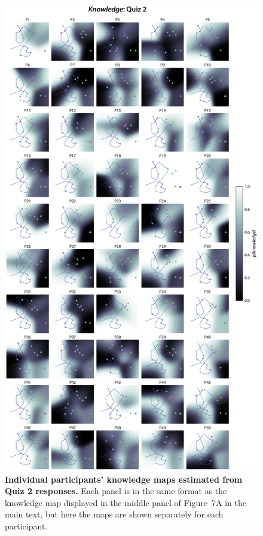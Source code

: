\documentclass[10pt]{article}
\newcommand{\knowledgeMaps}{7}
\begin{document}
\begin{figure}[tp]
    \centering
    \includegraphics[height=0.9\textheight]{figs/individual-knowledge-maps-quiz2}
    
    \caption{\textbf{Individual participants' knowledge maps estimated from
    Quiz 2 responses.} Each panel is in the same format as the knowledge map
    displayed in the middle panel of Figure~\knowledgeMaps A in the main text,
    but here the maps are shown separately for each participant.}
    
    \label{fig:knowledge-maps-q2}
\end{figure}
\end{document}
